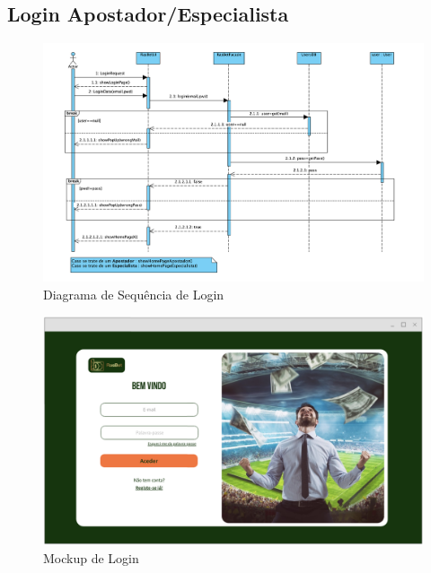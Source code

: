 \subsection{Login Apostador/Especialista}
\begin{figure}[H]
\centering
\includegraphics[width=1\textwidth]{imagens/ambitoProduto/SLogin.png}
\caption{Diagrama de Sequência de Login}
\end{figure}
\begin{figure}[H]
\centering
\includegraphics[width=1\textwidth]{imagens/ambitoProduto/Mockups/M_Login.png}
\caption{Mockup de Login}
\end{figure}

